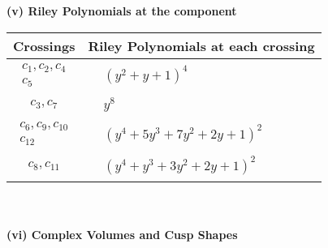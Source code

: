 \documentclass[1p]{elsarticle_modified}
\theoremstyle{definition}
\begin{document}
\newpage\renewcommand{\arraystretch}{1}
\flushleft \textbf{(v) Riley Polynomials at the component}\newline \\
\begin{tabular}{m{50pt}|m{274pt}}
Crossings & \hspace{64pt}Riley Polynomials at each crossing \\
\hline $$\begin{aligned}c_{1},c_{2},c_{4}\\c_{5}\end{aligned}$$&$\begin{aligned}
&(y^2+y+1)^4
\end{aligned}$\\
\hline $$\begin{aligned}c_{3},c_{7}\end{aligned}$$&$\begin{aligned}
&y^8
\end{aligned}$\\
\hline $$\begin{aligned}c_{6},c_{9},c_{10}\\c_{12}\end{aligned}$$&$\begin{aligned}
&(y^4+5 y^3+7 y^2+2 y+1)^2
\end{aligned}$\\
\hline $$\begin{aligned}c_{8},c_{11}\end{aligned}$$&$\begin{aligned}
&(y^4+y^3+3 y^2+2 y+1)^2
\end{aligned}$\\
\hline
\end{tabular}\\~\\
\newpage\flushleft \textbf{(vi) Complex Volumes and Cusp Shapes}
\end{document}

